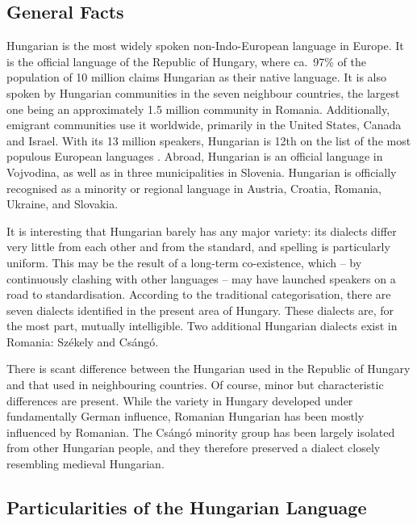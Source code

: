   \begin{multicols}{2}

  \subsection{General Facts}

  Hungarian is the most widely spoken non-Indo-European language in Europe. It is the official language of the Republic of Hungary, where ca.\ 97\% of the population of 10 million claims Hungarian as their native language. It is also spoken by Hungarian communities in the seven neighbour countries, the largest one being an approximately 1.5 million community in Romania. Additionally, emigrant communities use it worldwide, primarily in the United States, Canada and Israel. With its 13 million speakers, Hungarian is 12th on the list of the most populous European languages \cite{didyouknow1}. Abroad, Hungarian is an official language in Vojvodina, as well as in three municipalities in Slovenia. Hungarian is officially recognised as a minority or regional language in Austria, Croatia, Romania, Ukraine, and Slovakia.

  It is interesting that Hungarian barely has any major variety: its dialects differ very little from each other and from the standard, and spelling is particularly uniform. This may be the result of a long-term co-existence, which -- by continuously clashing with other languages -- may have launched speakers on a road to standardisation. According to the traditional categorisation, there are seven dialects identified in the present area of Hungary. These dialects are, for the most part, mutually intelligible. Two additional Hungarian dialects exist in Romania: Székely and Csángó.

  There is scant difference between the Hungarian used in the Republic of Hungary and that used in neighbouring countries. Of course, minor but characteristic differences are present. While the variety in Hungary developed under fundamentally German influence, Romanian Hungarian has been mostly influenced by Romanian. The Csángó minority group has been largely isolated from other Hungarian people, and they therefore preserved a dialect closely resembling medieval Hungarian.


  \subsection{Particularities of the Hungarian Language}


\end{multicols}
